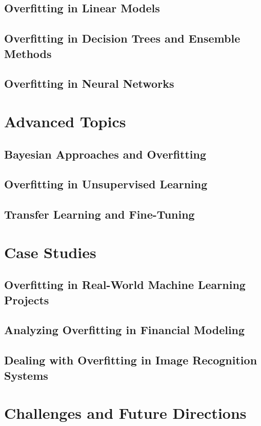 \documentclass[12pt]{book} %
\begin{document}
\subsection{Overfitting in Linear Models}
\subsection{Overfitting in Decision Trees and Ensemble Methods}
\subsection{Overfitting in Neural Networks}

\section{Advanced Topics}
\subsection{Bayesian Approaches and Overfitting}
\subsection{Overfitting in Unsupervised Learning}
\subsection{Transfer Learning and Fine-Tuning}

\section{Case Studies}
\subsection{Overfitting in Real-World Machine Learning Projects}
\subsection{Analyzing Overfitting in Financial Modeling}
\subsection{Dealing with Overfitting in Image Recognition Systems}

\section{Challenges and Future Directions}
\end{document}
